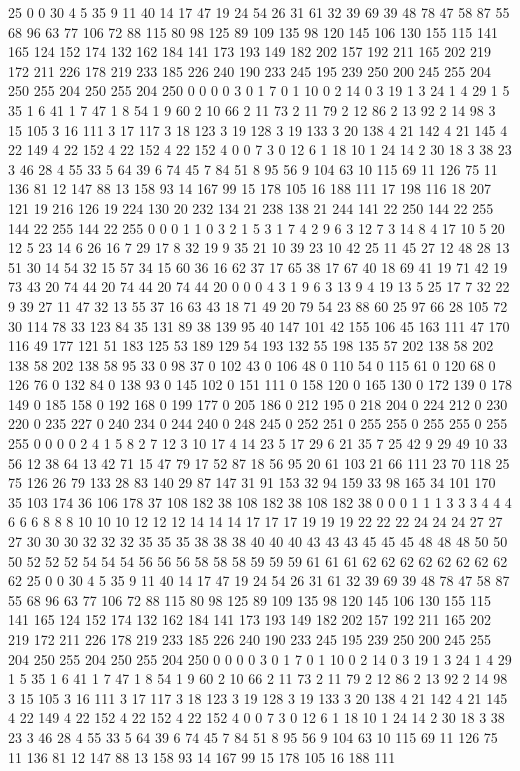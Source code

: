 25 0 0 30 4 5 35 9 11 40 14 17 47 19 24 54 26 31 61 32 39 69 39 48 78 47 58 87 55 68 96 63 77 106 72 88 115 80 98 125 89 109 135 98 120 145 106 130 155 115 141 165 124 152 174 132 162 184 141 173 193 149 182 202 157 192 211 165 202 219 172 211 226 178 219 233 185 226 240 190 233 245 195 239 250 200 245 255 204 250 255 204 250 255 204 250 0 0 0 0 3 0 1 7 0 1 10 0 2 14 0 3 19 1 3 24 1 4 29 1 5 35 1 6 41 1 7 47 1 8 54 1 9 60 2 10 66 2 11 73 2 11 79 2 12 86 2 13 92 2 14 98 3 15 105 3 16 111 3 17 117 3 18 123 3 19 128 3 19 133 3 20 138 4 21 142 4 21 145 4 22 149 4 22 152 4 22 152 4 22 152 4 0 0 7 3 0 12 6 1 18 10 1 24 14 2 30 18 3 38 23 3 46 28 4 55 33 5 64 39 6 74 45 7 84 51 8 95 56 9 104 63 10 115 69 11 126 75 11 136 81 12 147 88 13 158 93 14 167 99 15 178 105 16 188 111 
17 198 116 18 207 121 19 216 126 19 224 130 20 232 134 21 238 138 21 244 141 22 250 144 22 255 144 22 255 144 22 255 0 0 0 1 1 0 3 2 1 5 3 1 7 4 2 9 6 3 12 7 3 14 8 4 17 10 5 20 12 5 23 14 6 26 16 7 29 17 8 32 19 9 35 21 10 39 23 10 42 25 11 45 27 12 48 28 13 51 30 14 54 32 15 57 34 15 60 36 16 62 37 17 65 38 17 67 40 18 69 41 19 71 42 19 73 43 20 74 44 20 74 44 20 74 44 20 0 0 0 4 3 1 9 6 3 13 9 4 19 13 5 25 17 7 32 22 9 39 27 11 47 32 13 55 37 16 63 43 18 71 49 20 79 54 23 88 60 25 97 66 28 105 72 30 114 78 33 123 84 35 131 89 38 139 95 40 147 101 42 155 106 45 163 111 47 170 116 49 177 121 51 183 125 53 189 129 54 193 132 55 198 135 57 202 138 58 202 138 58 202 138 58 95 33 0 98 37 0 102 43 0 106 48 0 110 54 0 115 61 0 120 68 0 126 76 0 132 84 0 138 93 0 145 102 
0 151 111 0 158 120 0 165 130 0 172 139 0 178 149 0 185 158 0 192 168 0 199 177 0 205 186 0 212 195 0 218 204 0 224 212 0 230 220 0 235 227 0 240 234 0 244 240 0 248 245 0 252 251 0 255 255 0 255 255 0 255 255 0 0 0 0 2 4 1 5 8 2 7 12 3 10 17 4 14 23 5 17 29 6 21 35 7 25 42 9 29 49 10 33 56 12 38 64 13 42 71 15 47 79 17 52 87 18 56 95 20 61 103 21 66 111 23 70 118 25 75 126 26 79 133 28 83 140 29 87 147 31 91 153 32 94 159 33 98 165 34 101 170 35 103 174 36 106 178 37 108 182 38 108 182 38 108 182 38 0 0 0 1 1 1 3 3 3 4 4 4 6 6 6 8 8 8 10 10 10 12 12 12 14 14 14 17 17 17 19 19 19 22 22 22 24 24 24 27 27 27 30 30 30 32 32 32 35 35 35 38 38 38 40 40 40 43 43 43 45 45 45 48 48 48 50 50 50 52 52 52 54 54 54 56 56 56 58 58 58 59 59 59 61 61 61 62 62 62 62 62 62 62 62 62 
25 0 0 30 4 5 35 9 11 40 14 17 47 19 24 54 26 31 61 32 39 69 39 48 78 47 58 87 55 68 96 63 77 106 72 88 115 80 98 125 89 109 135 98 120 145 106 130 155 115 141 165 124 152 174 132 162 184 141 173 193 149 182 202 157 192 211 165 202 219 172 211 226 178 219 233 185 226 240 190 233 245 195 239 250 200 245 255 204 250 255 204 250 255 204 250 0 0 0 0 3 0 1 7 0 1 10 0 2 14 0 3 19 1 3 24 1 4 29 1 5 35 1 6 41 1 7 47 1 8 54 1 9 60 2 10 66 2 11 73 2 11 79 2 12 86 2 13 92 2 14 98 3 15 105 3 16 111 3 17 117 3 18 123 3 19 128 3 19 133 3 20 138 4 21 142 4 21 145 4 22 149 4 22 152 4 22 152 4 22 152 4 0 0 7 3 0 12 6 1 18 10 1 24 14 2 30 18 3 38 23 3 46 28 4 55 33 5 64 39 6 74 45 7 84 51 8 95 56 9 104 63 10 115 69 11 126 75 11 136 81 12 147 88 13 158 93 14 167 99 15 178 105 16 188 111 
